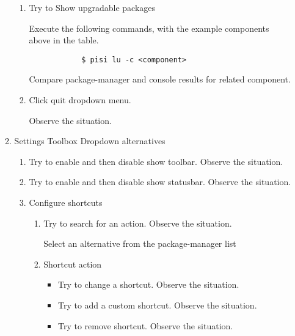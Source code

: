 \documentclass[a4paper,10pt]{article}
\begin{document}
\begin{enumerate}
\begin{enumerate}
\begin{enumerate}
            \item Try to Show upgradable packages
            
            Execute the following commands, with the example components above in the table.
            \begin{verbatim}
            $ pisi lu -c <component>
            \end{verbatim}
            Compare package-manager and console results for related component.
    
            \item Click quit dropdown menu. 
    
            Observe the situation.
        \end{enumerate}
    
        \item Settings Toolbox
        Dropdown alternatives
        \begin{enumerate}
            \item Try to enable and then disable show toolbar. Observe the situation.
            \item Try to enable and then disable show statusbar. Observe the situation.
            \item Configure shortcuts
            \begin{enumerate}
                \item Try to search for an action. Observe the situation.
    
                Select an alternative from the package-manager list
                \item Shortcut action
                \begin{itemize}
                    \item Try to change a shortcut. Observe the situation.
                    \item Try to add a custom shortcut. Observe the situation.
                    \item Try to remove shortcut. Observe the situation.
                \end{itemize}
    

\end{enumerate}
\end{enumerate}
\end{enumerate}
\end{enumerate}
\end{document}

